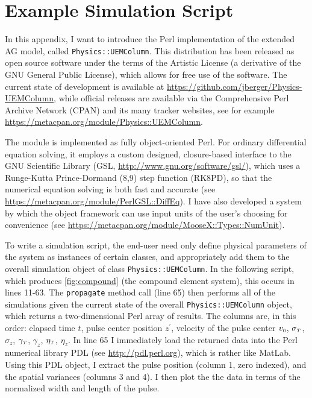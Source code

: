 \chapter{Example Simulation Script} \label{sec:script}

In this appendix, I want to introduce the Perl implementation of the extended AG model, called \verb!Physics::UEMColumn!.
This distribution has been released as open source software under the terms of the Artistic License (a derivative of the GNU General Public License), which allows for free use of the software.
The current state of development is available at \url{https://github.com/jberger/Physics-UEMColumn}, while official releases are available via the Comprehensive Perl Archive Network (CPAN) and its many tracker websites, see for example \url{https://metacpan.org/module/Physics::UEMColumn}.

The module is implemented as fully object-oriented Perl.
For ordinary differential equation solving, it employs a custom designed, closure-based interface to the GNU Scientific Library (GSL, \url{http://www.gnu.org/software/gsl/}), which uses a Runge-Kutta Prince-Dormand (8,9) step function (RK8PD), so that the numerical equation solving is both fast and accurate (see \url{https://metacpan.org/module/PerlGSL::DiffEq}).
I have also developed a system by which the object framework can use input units of the user's choosing for convenience (see \url{https://metacpan.org/module/MooseX::Types::NumUnit}).

To write a simulation script, the end-user need only define physical parameters of the system as instances of certain classes, and appropriately add them to the overall simulation object of class \verb!Physics::UEMColumn!.
In the following script, which produces \ref{fig:compound} (the compound element system), this occurs in lines 11-63.
The \verb!propagate! method call (line 65) then performs all of the simulations given the current state of the overall \verb!Physics::UEMColumn! object, which returns a two-dimensional Perl array of results.
The columns are, in this order: elapsed time $t$, pulse center position $z^{\prime}$, velocity of the pulse center $v_{{\scriptscriptstyle 0}}$, $\sigma_{{\scriptscriptstyle T}}$, $\sigma_{z}$, $\gamma_{{\scriptscriptstyle T}}$, $\gamma_{z}$, $\eta_{{\scriptscriptstyle T}}$, $\eta_{z}$.
In line 65 I immediately load the returned data into the Perl numerical library PDL (see \url{http://pdl.perl.org}), which is rather like MatLab.
Using this PDL object, I extract the pulse position (column 1, zero indexed), and the spatial variances (columns 3 and 4).
I then plot the the data in terms of the normalized width and length of the pulse. 


